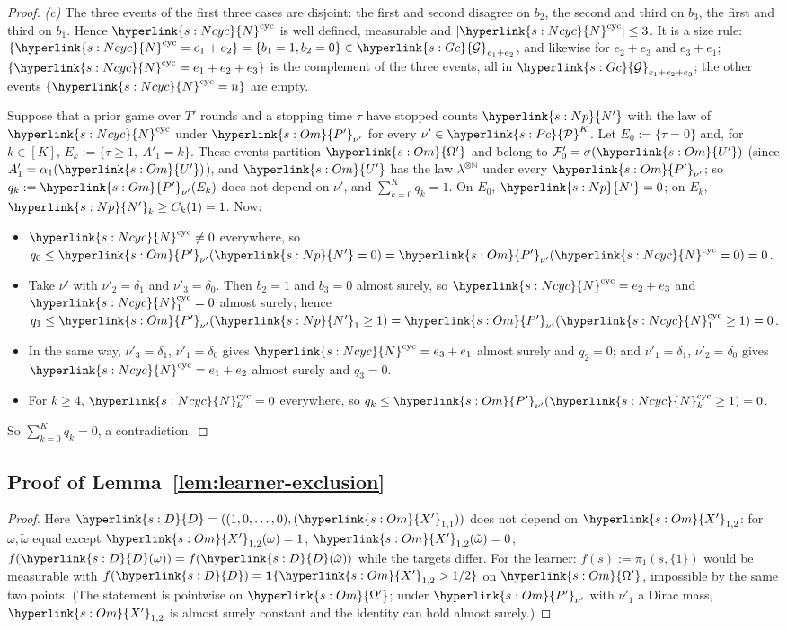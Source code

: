 \documentclass[11pt]{article}
\newcommand{\sy}[2]{\hyperlink{#1}{#2}}
\newcommand{\N}{\mathbb{N}}
\newcommand{\ind}{\mathbf{1}}
\newcommand{\Pc}{\sy{s:Pc}{\mathcal{P}}}
\newcommand{\Gc}{\sy{s:Gc}{\mathcal{G}}}
\newcommand{\Np}{\sy{s:Np}{N'}}
\newcommand{\Dd}{\sy{s:D}{D}}
\newcommand{\Om}{\sy{s:Om}{\Omega'}}
\newcommand{\Up}{\sy{s:Om}{U'}}
\newcommand{\Xp}{\sy{s:Om}{X'}}
\newcommand{\Pp}{\sy{s:Om}{P'}}
\newcommand{\Ncyc}{\sy{s:Ncyc}{N}^{\mathrm{cyc}}}
\begin{document}
\begin{proof}
\emph{(c)} The three events of the first three cases are disjoint: the first and second disagree on
$b_2$, the second and third on $b_3$, the first and third on $b_1$. Hence $\Ncyc$ is well defined,
measurable and $|\Ncyc|\le3$. It is a size rule: $\{\Ncyc=e_1+e_2\}=\{b_1=1,b_2=0\}\in\Gc_{e_1+e_2}$,
and likewise for $e_2+e_3$ and $e_3+e_1$; $\{\Ncyc=e_1+e_2+e_3\}$ is the complement of the three
events, all in $\Gc_{e_1+e_2+e_3}$; the other events $\{\Ncyc=n\}$ are empty.

Suppose that a prior game over $T'$ rounds and a stopping time $\tau$ have stopped counts $\Np$ with
the law of $\Ncyc$ under $\Pp_{\nu'}$ for every $\nu'\in\Pc^K$. Let $E_0:=\{\tau=0\}$ and, for
$k\in[K]$, $E_k:=\{\tau\ge1,\ A'_1=k\}$. These events partition $\Om$ and belong to
$\mathcal F'_0=\sigma(\Up)$ (since $A'_1=\alpha_1(\Up)$), and $\Up$ has the law $\lambda^{\otimes\N}$
under every $\Pp_{\nu'}$; so $q_k:=\Pp_{\nu'}(E_k)$ does not depend on $\nu'$, and
$\sum_{k=0}^Kq_k=1$. On $E_0$, $\Np=0$; on $E_k$, $\Np_k\ge C_k(1)=1$. Now:
\begin{itemize}
\item $\Ncyc\ne0$ everywhere, so $q_0\le \Pp_{\nu'}(\Np=0)=\Pp_{\nu'}(\Ncyc=0)=0$.
\item Take $\nu'$ with $\nu'_2=\delta_1$ and $\nu'_3=\delta_0$. Then $b_2=1$ and $b_3=0$ almost
  surely, so $\Ncyc=e_2+e_3$ and $\Ncyc_1=0$ almost surely; hence $q_1\le \Pp_{\nu'}(\Np_1\ge1)
  =\Pp_{\nu'}(\Ncyc_1\ge1)=0$.
\item In the same way, $\nu'_3=\delta_1$, $\nu'_1=\delta_0$ gives $\Ncyc=e_3+e_1$ almost surely and
  $q_2=0$; and $\nu'_1=\delta_1$, $\nu'_2=\delta_0$ gives $\Ncyc=e_1+e_2$ almost surely and $q_3=0$.
\item For $k\ge4$, $\Ncyc_k=0$ everywhere, so $q_k\le \Pp_{\nu'}(\Ncyc_k\ge1)=0$.
\end{itemize}
So $\sum_{k=0}^Kq_k=0$, a contradiction.
\end{proof}

\subsection{Proof of Lemma~\ref{lem:learner-exclusion}}

\begin{proof}
Here $\Dd=((1,0,\dots,0),(\Xp_{1,1}))$ does not depend on $\Xp_{1,2}$: for $\omega,\tilde\omega$ equal
except $\Xp_{1,2}(\omega)=1$, $\Xp_{1,2}(\tilde\omega)=0$, $f(\Dd(\omega))=f(\Dd(\tilde\omega))$ while the
targets differ. For the learner: $f(s):=\pi_1(s,\{1\})$ would be measurable with
$f(\Dd)=\ind\{\Xp_{1,2}>1/2\}$ on $\Om$, impossible by the same two points. (The statement is
pointwise on $\Om$; under $\Pp_{\nu'}$ with $\nu'_1$ a Dirac mass, $\Xp_{1,2}$ is almost surely
constant and the identity can hold almost surely.)
\end{proof}
\end{document}
